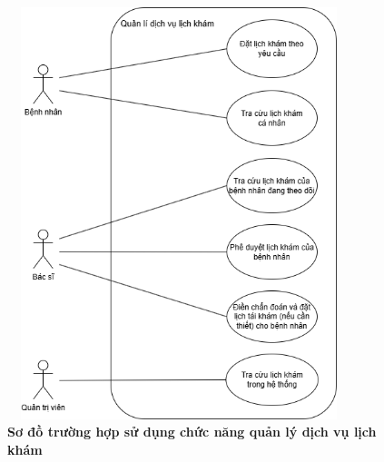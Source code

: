 \begin{figure}[H]
	\centering
	\includegraphics[width=10cm,height=12cm]{Images/use_case/use_case_schedule.png}
	\caption[Sơ đồ trường hợp sử dụng chức năng quản lý dịch vụ lịch khám]{\bfseries \fontsize{12pt}{0pt}
		\selectfont Sơ đồ trường hợp sử dụng chức năng quản lý dịch vụ lịch khám}
	\label{use_case_schedule} %
\end{figure}


